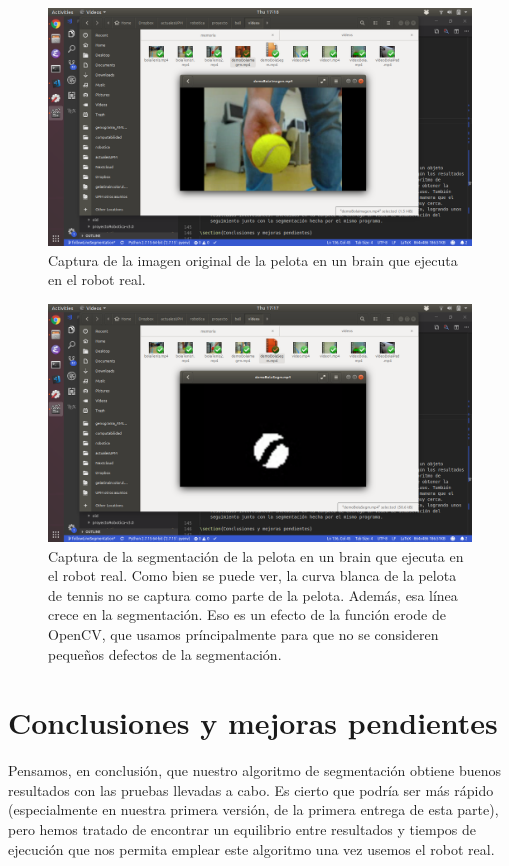 \documentclass{article}
\begin{document}
	\begin{figure}[H]
	    \centering
	    \includegraphics[width=12cm]{./figures/pelota2.png}
	    \caption{Captura de la imagen original de la pelota en un brain que ejecuta en el robot real.}
	    \label{fig:pelota1}
	\end{figure}

	\begin{figure}[H]
	    \centering
	    \includegraphics[width=12cm]{./figures/pelota1.png}
	    \caption{Captura de la segmentación de la pelota en un brain que ejecuta en el robot real. Como bien se puede ver, la curva blanca de la pelota de tennis no se captura como parte de la pelota. Además, esa línea crece en la segmentación. Eso es un efecto de la función erode de OpenCV, que usamos príncipalmente para que no se consideren pequeños defectos de la segmentación.}
	    \label{fig:pelota2}
	\end{figure}

\section{Conclusiones y mejoras pendientes}

	Pensamos, en conclusión, que nuestro algoritmo de segmentación obtiene buenos resultados con las pruebas llevadas a cabo. Es cierto que podría ser más rápido (especialmente en nuestra primera versión, de la primera entrega de esta parte), pero hemos tratado de encontrar un equilibrio entre resultados y tiempos de ejecución que nos permita emplear este algoritmo una vez usemos el robot real.
	
\end{document}
